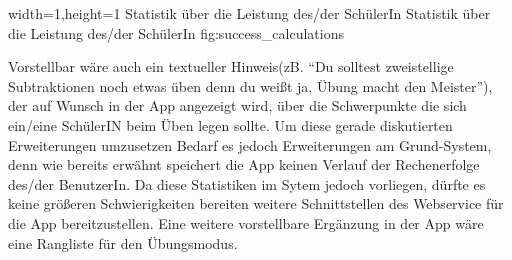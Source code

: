   {width=1\textwidth,height=1\textheight}%
  {Statistik über die Leistung des/der SchülerIn}%
  {Statistik über die Leistung des/der SchülerIn}%
  {fig:success_calculations}%


Vorstellbar wäre auch ein textueller Hinweis(zB. \enquote{Du solltest zweistellige Subtraktionen noch 
etwas üben denn du weißt ja, Übung macht den Meister}), der auf Wunsch in der App angezeigt wird, über die
Schwerpunkte die sich ein/eine SchülerIN beim Üben legen sollte. Um diese gerade diskutierten Erweiterungen 
umzusetzen Bedarf es jedoch Erweiterungen am Grund-System, denn wie bereits
erwähnt speichert die App keinen Verlauf der Rechenerfolge des/der BenutzerIn. Da diese Statistiken im 
Sytem jedoch vorliegen, dürfte es keine größeren Schwierigkeiten bereiten weitere Schnittstellen
des Webservice für die App bereitzustellen.
Eine weitere vorstellbare Ergänzung in der App wäre eine Rangliste für den Übungsmodus.


